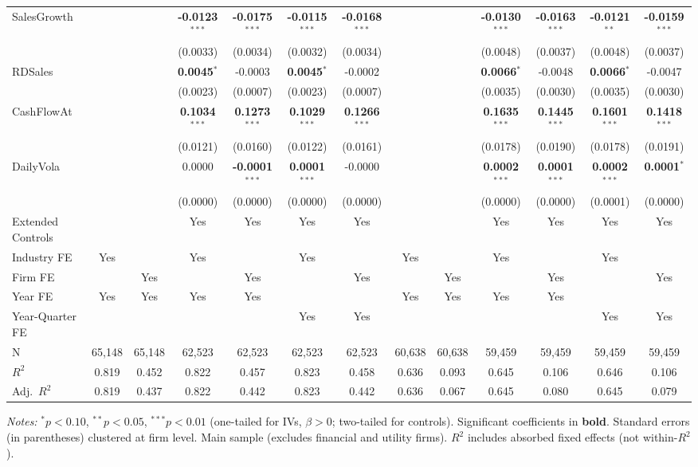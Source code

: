 \documentclass[11pt,a4paper]{article}
\begin{document}
\begin{table}[htbp]
\begin{tabular}{lcccccccccccc}
SalesGrowth &  &  & \textbf{-0.0123}$^{***}$ & \textbf{-0.0175}$^{***}$ & \textbf{-0.0115}$^{***}$ & \textbf{-0.0168}$^{***}$ &  &  & \textbf{-0.0130}$^{***}$ & \textbf{-0.0163}$^{***}$ & \textbf{-0.0121}$^{**}$ & \textbf{-0.0159}$^{***}$ \\
 &  &  & (0.0033) & (0.0034) & (0.0032) & (0.0034) &  &  & (0.0048) & (0.0037) & (0.0048) & (0.0037) \\
RDSales &  &  & \textbf{0.0045}$^{*}$ & -0.0003 & \textbf{0.0045}$^{*}$ & -0.0002 &  &  & \textbf{0.0066}$^{*}$ & -0.0048 & \textbf{0.0066}$^{*}$ & -0.0047 \\
 &  &  & (0.0023) & (0.0007) & (0.0023) & (0.0007) &  &  & (0.0035) & (0.0030) & (0.0035) & (0.0030) \\
CashFlowAt &  &  & \textbf{0.1034}$^{***}$ & \textbf{0.1273}$^{***}$ & \textbf{0.1029}$^{***}$ & \textbf{0.1266}$^{***}$ &  &  & \textbf{0.1635}$^{***}$ & \textbf{0.1445}$^{***}$ & \textbf{0.1601}$^{***}$ & \textbf{0.1418}$^{***}$ \\
 &  &  & (0.0121) & (0.0160) & (0.0122) & (0.0161) &  &  & (0.0178) & (0.0190) & (0.0178) & (0.0191) \\
DailyVola &  &  & 0.0000 & \textbf{-0.0001}$^{***}$ & \textbf{0.0001}$^{***}$ & -0.0000 &  &  & \textbf{0.0002}$^{***}$ & \textbf{0.0001}$^{***}$ & \textbf{0.0002}$^{***}$ & \textbf{0.0001}$^{*}$ \\
 &  &  & (0.0000) & (0.0000) & (0.0000) & (0.0000) &  &  & (0.0000) & (0.0000) & (0.0001) & (0.0000) \\
\midrule
Extended Controls &  &  & Yes & Yes & Yes & Yes &  &  & Yes & Yes & Yes & Yes \\
Industry FE & Yes &  & Yes &  & Yes &  & Yes &  & Yes &  & Yes &  \\
Firm FE &  & Yes &  & Yes &  & Yes &  & Yes &  & Yes &  & Yes \\
Year FE & Yes & Yes & Yes & Yes &  &  & Yes & Yes & Yes & Yes &  &  \\
Year-Quarter FE &  &  &  &  & Yes & Yes &  &  &  &  & Yes & Yes \\
\midrule
N & 65,148 & 65,148 & 62,523 & 62,523 & 62,523 & 62,523 & 60,638 & 60,638 & 59,459 & 59,459 & 59,459 & 59,459 \\
$R^2$ & 0.819 & 0.452 & 0.822 & 0.457 & 0.823 & 0.458 & 0.636 & 0.093 & 0.645 & 0.106 & 0.646 & 0.106 \\
Adj.~$R^2$ & 0.819 & 0.437 & 0.822 & 0.442 & 0.823 & 0.442 & 0.636 & 0.067 & 0.645 & 0.080 & 0.645 & 0.079 \\
\bottomrule
\end{tabular}
\begin{minipage}{\linewidth}
\vspace{2pt}\scriptsize
\textit{Notes:} $^{*}p<0.10$, $^{**}p<0.05$, $^{***}p<0.01$ (one-tailed for IVs, $\beta > 0$; two-tailed for controls).
 Significant coefficients in \textbf{bold}.
 Standard errors (in parentheses) clustered at firm level.
 Main sample (excludes financial and utility firms).
 $R^2$ includes absorbed fixed effects (not within-$R^2$).
\end{minipage}
\end{table}
\end{document}
